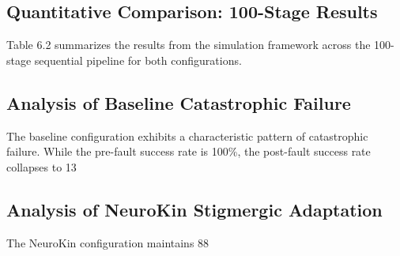 \documentclass[12pt,a4paper,oneside]{report}
\begin{document}
\subsection{Quantitative Comparison: 100-Stage Results}

Table 6.2 summarizes the results from the simulation framework across the 100-stage sequential pipeline for both configurations.

\begin{table}[H]
\centering
\caption{Sequential swarm performance comparison (100 stages, progressive fault injection).}
\label{tab:swarm_results_ch6}
\end{table}

\subsection{Analysis of Baseline Catastrophic Failure}

The baseline configuration exhibits a characteristic pattern of catastrophic failure. While the pre-fault success rate is 100\%, the post-fault success rate collapses to 13%

\subsection{Analysis of NeuroKin Stigmergic Adaptation}

The NeuroKin configuration maintains 88%
\end{document}
